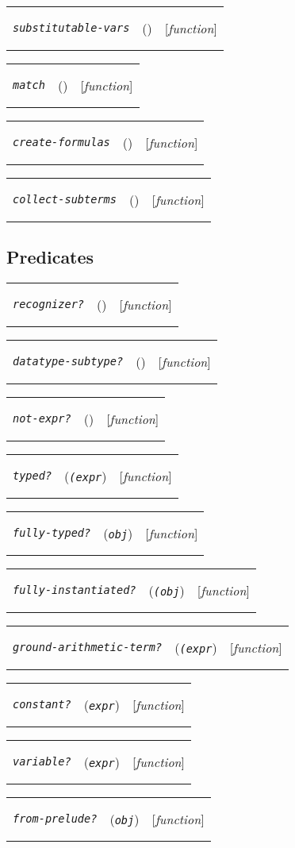 \documentclass[12pt]{book}
\makeatletter
\newenvironment{function}[3]%
{\par\noindent\begin{boxedminipage}{\textwidth}%
 \par\noindent\begin{tabularx}{\linewidth}{l>{\raggedright}Xr}%
 \functionhtgt{#1}&(\texttt{\textit{#2}})&[\emph{#3}]%
 \end{tabularx}\par\flushright\begin{minipage}{.97\textwidth}}
{\end{minipage}\end{boxedminipage}}
\newcommand{\functionnm}[1]{\texttt{\textit{#1}}}
\newcommand{\functionhtgt}[1]{\hypertarget{#1}{\functionnm{#1}}\index{#1@\functionnm{#1}|underline}}
\newenvironment{lispfunction}[2]%
{\begin{function}{#1}{#2}{function}}{\end{function}}
\makeatother
\begin{document}
\begin{lispfunction}{substitutable-vars}{}
\end{lispfunction}

\begin{lispfunction}{match}{}
\end{lispfunction}

\begin{lispfunction}{create-formulas}{}
\end{lispfunction}

\begin{lispfunction}{collect-subterms}{}
\end{lispfunction}


\subsection{Predicates}

\begin{lispfunction}{recognizer?}{}
\end{lispfunction}

\begin{lispfunction}{datatype-subtype?}{}
\end{lispfunction}

\begin{lispfunction}{not-expr?}{}
\end{lispfunction}

\begin{lispfunction}{typed?}{(expr}
\end{lispfunction}

\begin{lispfunction}{fully-typed?}{obj}
\end{lispfunction}

\begin{lispfunction}{fully-instantiated?}{(obj}
\end{lispfunction}

\begin{lispfunction}{ground-arithmetic-term?}{(expr}
\end{lispfunction}

\begin{lispfunction}{constant?}{expr}
\end{lispfunction}

\begin{lispfunction}{variable?}{expr}
\end{lispfunction}

\begin{lispfunction}{from-prelude?}{obj}
\end{lispfunction}
\end{document}
